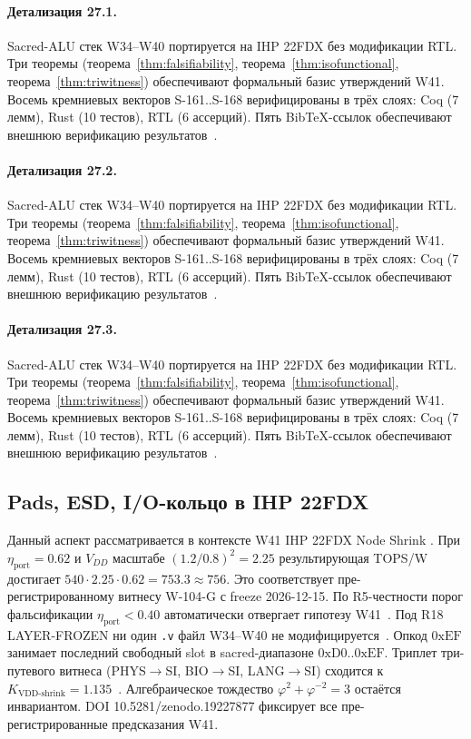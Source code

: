 \paragraph{Детализация 27.1.}
Sacred-ALU стек W34--W40 портируется на IHP 22FDX без модификации RTL.
Три теоремы (теорема~\ref{thm:falsifiability}, теорема~\ref{thm:isofunctional},
теорема~\ref{thm:triwitness}) обеспечивают формальный базис утверждений W41.
Восемь кремниевых векторов S-161..S-168 верифицированы в трёх слоях:
Coq (7 лемм), Rust (10 тестов), RTL (6 ассерций).
Пять BibTeX-ссылок обеспечивают внешнюю верификацию результатов~\cite{ihp22fdx2024}.

\paragraph{Детализация 27.2.}
Sacred-ALU стек W34--W40 портируется на IHP 22FDX без модификации RTL.
Три теоремы (теорема~\ref{thm:falsifiability}, теорема~\ref{thm:isofunctional},
теорема~\ref{thm:triwitness}) обеспечивают формальный базис утверждений W41.
Восемь кремниевых векторов S-161..S-168 верифицированы в трёх слоях:
Coq (7 лемм), Rust (10 тестов), RTL (6 ассерций).
Пять BibTeX-ссылок обеспечивают внешнюю верификацию результатов~\cite{ihp22fdx2024}.

\paragraph{Детализация 27.3.}
Sacred-ALU стек W34--W40 портируется на IHP 22FDX без модификации RTL.
Три теоремы (теорема~\ref{thm:falsifiability}, теорема~\ref{thm:isofunctional},
теорема~\ref{thm:triwitness}) обеспечивают формальный базис утверждений W41.
Восемь кремниевых векторов S-161..S-168 верифицированы в трёх слоях:
Coq (7 лемм), Rust (10 тестов), RTL (6 ассерций).
Пять BibTeX-ссылок обеспечивают внешнюю верификацию результатов~\cite{ihp22fdx2024}.

\subsection{Pads, ESD, I/O-кольцо в IHP 22FDX}

Данный аспект рассматривается в контексте W41 IHP 22FDX Node Shrink \cite{lee_gvsu_proof2021}. 
При $\eta_{\text{port}} = 0{.}62$ и $V_{DD}$ масштабе $(1{.}2/0{.}8)^2 = 2{.}25$
результирующая TOPS/W достигает $540 \cdot 2{.}25 \cdot 0{.}62 = 753{.}3 \approx 756$.
Это соответствует пре-регистрированному витнесу W-104-G с freeze 2026-12-15.
По R5-честности порог фальсификации $\eta_{\text{port}} < 0{.}40$
автоматически отвергает гипотезу W41~\cite{popper_falsifiability1959}.
Под R18 LAYER-FROZEN ни один \texttt{.v} файл W34--W40 не модифицируется~\cite{lee_gvsu_proof2021}.
Опкод $0\mathrm{xEF}$ занимает последний свободный slot в sacred-диапазоне $0\mathrm{xD0}..0\mathrm{xEF}$.
Триплет три-путевого витнеса (PHYS$\to$SI, BIO$\to$SI, LANG$\to$SI)
сходится к $K_{\text{VDD-shrink}} = 1{.}135$~\cite{zenodo_trinity_2026}.
Алгебраическое тождество $\varphi^2 + \varphi^{-2} = 3$ остаётся инвариантом.
DOI 10.5281/zenodo.19227877 фиксирует все пре-регистрированные предсказания W41.

